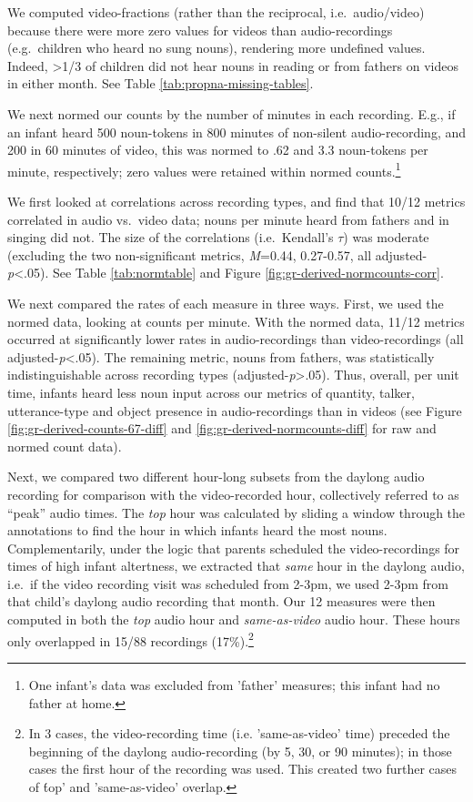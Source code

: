 \documentclass[man]{apa6}
\theoremstyle{definition}
\theoremstyle{definition}
\theoremstyle{definition}
\theoremstyle{remark}
\begin{document}
We computed video-fractions (rather than the reciprocal,
i.e.~audio/video) because there were more zero values for videos than
audio-recordings (e.g.~children who heard no sung nouns), rendering more
undefined values. Indeed, \textgreater{}1/3 of children did not hear
nouns in reading or from fathers on videos in either month. See Table
\ref{tab:propna-missing-tables}.

We next normed our counts by the number of minutes in each recording.
E.g., if an infant heard 500 noun-tokens in 800 minutes of non-silent
audio-recording, and 200 in 60 minutes of video, this was normed to .62
and 3.3 noun-tokens per minute, respectively; zero values were retained
within normed
counts.\footnote{One infant's data was excluded from 'father' measures; this infant had no father at home.}

We first looked at correlations across recording types, and find that
10/12 metrics correlated in audio vs.~video data; nouns per minute heard
from fathers and in singing did not. The size of the correlations
(i.e.~Kendall's \(\tau\)) was moderate (excluding the two
non-significant metrics, \emph{M}=0.44, 0.27-0.57, all
adjusted-\emph{p}\textless{}.05). See Table \ref{tab:normtable} and
Figure \ref{fig:gr-derived-normcounts-corr}.

We next compared the rates of each measure in three ways. First, we used
the normed data, looking at counts per minute. With the normed data,
11/12 metrics occurred at significantly lower rates in audio-recordings
than video-recordings (all adjusted-\emph{p}\textless{}.05). The
remaining metric, nouns from fathers, was statistically
indistinguishable across recording types
(adjusted-\emph{p}\textgreater{}.05). Thus, overall, per unit time,
infants heard less noun input across our metrics of quantity, talker,
utterance-type and object presence in audio-recordings than in videos
(see Figure \ref{fig:gr-derived-counts-67-diff} and
\ref{fig:gr-derived-normcounts-diff} for raw and normed count data).

Next, we compared two different hour-long subsets from the daylong audio
recording for comparison with the video-recorded hour, collectively
referred to as \enquote{peak} audio times. The \emph{top} hour was
calculated by sliding a window through the annotations to find the hour
in which infants heard the most nouns. Complementarily, under the logic
that parents scheduled the video-recordings for times of high infant
altertness, we extracted that \emph{same} hour in the daylong audio,
i.e.~if the video recording visit was scheduled from 2-3pm, we used
2-3pm from that child's daylong audio recording that month. Our 12
measures were then computed in both the \emph{top} audio hour and
\emph{same-as-video} audio hour. These hours only overlapped in 15/88
recordings
(17\%).\footnote{In 3 cases, the video-recording time (i.e. 'same-as-video' time) preceded the beginning of the daylong audio-recording (by 5, 30, or 90 minutes); in those cases the first hour of the recording was used. This created two further cases of \'top' and 'same-as-video' overlap.}
\end{document}
